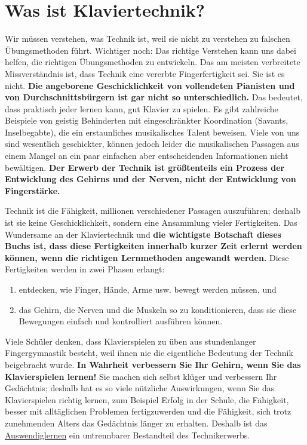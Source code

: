 \section{Was ist Klaviertechnik?}\hypertarget{c1i2}{}

Wir müssen verstehen, was Technik ist, weil sie nicht zu verstehen zu falschen Übungsmethoden führt.
Wichtiger noch: Das richtige Verstehen kann uns dabei helfen, die richtigen Übungsmethoden zu entwickeln.
Das am meisten verbreitete Missverständnis ist, dass Technik eine vererbte Fingerfertigkeit sei.
Sie ist es nicht.
\textbf{Die angeborene Geschicklichkeit von vollendeten Pianisten und von Durchschnittsbürgern ist gar nicht so unterschiedlich.}
Das bedeutet, dass praktisch jeder lernen kann, gut Klavier zu spielen.
Es gibt zahlreiche Beispiele von geistig Behinderten mit eingeschränkter Koordination (Savants, Inselbegabte), die ein erstaunliches musikalisches Talent beweisen.
Viele von uns sind wesentlich geschickter, können jedoch leider die musikalischen Passagen aus einem Mangel an ein paar einfachen aber entscheidenden Informationen nicht bewältigen.
\textbf{Der Erwerb der Technik ist größtenteils ein Prozess der Entwicklung des Gehirns und der Nerven, nicht der Entwicklung von Fingerstärke.}

Technik ist die Fähigkeit, millionen verschiedener Passagen auszuführen; deshalb ist sie keine Geschicklichkeit, sondern eine Ansammlung vieler Fertigkeiten.
Das Wundersame an der Klaviertechnik und \textbf{die wichtigste Botschaft dieses Buchs ist, dass diese Fertigkeiten innerhalb kurzer Zeit erlernt werden können, wenn die richtigen Lernmethoden angewandt werden.}
Diese Fertigkeiten werden in zwei Phasen erlangt:

\begin{enumerate}[label={\arabic*.}] 
\item entdecken, wie Finger, Hände, Arme usw. bewegt werden müssen, und
\item das Gehirn, die Nerven und die Muskeln so zu konditionieren, dass sie diese Bewegungen einfach und kontrolliert ausführen können.
 \end{enumerate}
Viele Schüler denken, dass Klavierspielen zu üben aus stundenlanger Fingergymnastik besteht, weil ihnen nie die eigentliche Bedeutung der Technik beigebracht wurde.
\textbf{In Wahrheit verbessern Sie Ihr Gehirn, wenn Sie das Klavierspielen lernen!}
Sie machen sich selbst klüger und verbessern Ihr Gedächtnis; deshalb hat es so viele nützliche Auswirkungen, wenn Sie das Klavierspielen richtig lernen, zum Beispiel Erfolg in der Schule, die Fähigkeit, besser mit alltäglichen Problemen fertigzuwerden und die Fähigkeit, sich trotz zunehmenden Alters das Gedächtnis länger zu erhalten.
Deshalb ist das \hyperlink{c1iii6}{Auswendiglernen} ein untrennbarer Bestandteil des Technikerwerbs.

